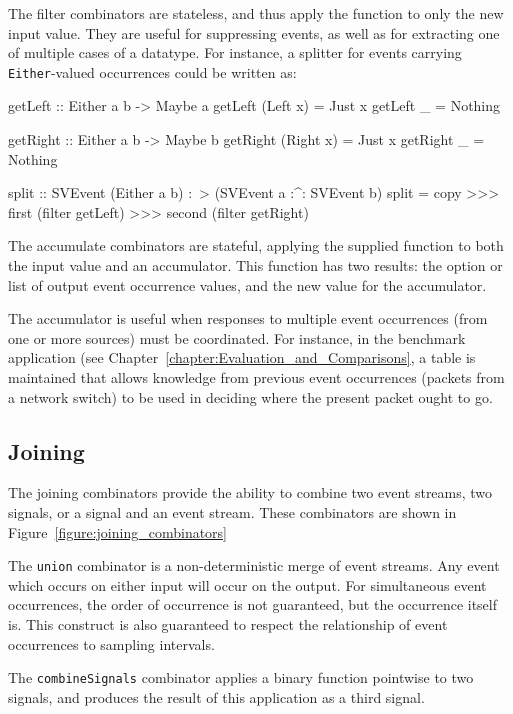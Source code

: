 The filter combinators are stateless, and thus apply the function to only the new
input value. They are useful for suppressing events, as well as for extracting one
of multiple cases of a datatype. For instance, a splitter for events carrying
{\tt Either}-valued occurrences could be written as:

\begin{code}
getLeft :: Either a b -> Maybe a
getLeft (Left x) = Just x
getLeft _ = Nothing

getRight :: Either a b -> Maybe b
getRight (Right x) = Just x
getRight _ = Nothing

split :: SVEvent (Either a b) :~> (SVEvent a :^: SVEvent b)
split = copy >>> first (filter getLeft) >>> second (filter getRight)
\end{code}

The accumulate combinators are stateful, applying the supplied function
to both the input value and an accumulator. This function has two results:
the option or list of output event occurrence values, and the new value
for the accumulator.

The accumulator is useful when responses to multiple event occurrences
(from one or more sources) must be coordinated. For instance, in the
benchmark application (see Chapter~\ref{chapter:Evaluation_and_Comparisons},
a table is maintained that allows knowledge from previous event occurrences
(packets from a network switch) to be used in deciding where the present
packet ought to go.

\subsection{Joining}
\label{subsection:System_Design_and_Interface-Combinators-Joining}

The joining combinators provide the ability to combine two event
streams, two signals, or a signal and an event stream. These
combinators are shown in Figure~\ref{figure:joining_combinators}

The {\tt union} combinator is a non-deterministic merge of event
streams. Any event which occurs on either input will occur
on the output. For simultaneous event occurrences, the order of occurrence
is not guaranteed, but the occurrence itself is. This construct
is also guaranteed to respect the relationship of event occurrences to sampling
intervals.

The {\tt combineSignals} combinator applies a binary function pointwise to two
signals, and produces the result of this application as a third signal.


